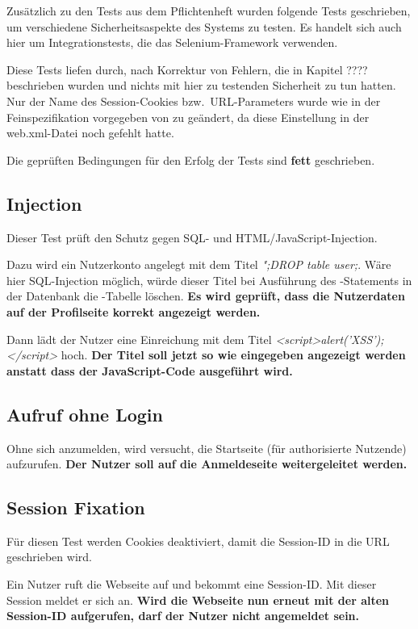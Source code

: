 
Zusätzlich zu den Tests aus dem Pflichtenheft wurden folgende Tests geschrieben,
um verschiedene Sicherheitsaspekte des Systems zu testen.
Es handelt sich auch hier um Integrationstests, die das Selenium-Framework verwenden.

Diese Tests liefen durch, nach Korrektur von Fehlern, die in Kapitel ???? beschrieben wurden und nichts mit hier zu testenden Sicherheit zu tun hatten.
Nur der Name des Session-Cookies bzw.~URL-Parameters wurde wie in der Feinspezifikation vorgegeben von  zu  geändert, da diese Einstellung in der web.xml-Datei noch gefehlt hatte.

Die geprüften Bedingungen für den Erfolg der Tests sind \textbf{fett} geschrieben.

\subsection{Injection}\label{subsec:injection-test}
Dieser Test prüft den Schutz gegen SQL- und HTML/JavaScript-Injection.

Dazu wird ein Nutzerkonto angelegt mit dem Titel \emph{";DROP table user;}.
Wäre hier SQL-Injection möglich, würde dieser Titel bei Ausführung des -Statements in der Datenbank
die -Tabelle löschen.
\textbf{Es wird geprüft, dass die Nutzerdaten auf der Profilseite korrekt angezeigt werden.}

Dann lädt der Nutzer eine Einreichung mit dem Titel \emph{<script>alert('XSS');</script>} hoch.
\textbf{Der Titel soll jetzt so wie eingegeben angezeigt werden anstatt dass der JavaScript-Code ausgeführt wird.}

\subsection{Aufruf ohne Login}\label{subsec:unauthorized-test}
Ohne sich anzumelden, wird versucht, die Startseite (für authorisierte Nutzende) aufzurufen.
\textbf{Der Nutzer soll auf die Anmeldeseite weitergeleitet werden.}

\subsection{Session Fixation}\label{subsec:session-fixation-test}
Für diesen Test werden Cookies deaktiviert, damit die Session-ID in die URL geschrieben wird.

Ein Nutzer ruft die Webseite auf und bekommt eine Session-ID\@.
Mit dieser Session meldet er sich an.
\textbf{Wird die Webseite nun erneut mit der alten Session-ID aufgerufen, darf der Nutzer nicht angemeldet sein.}

